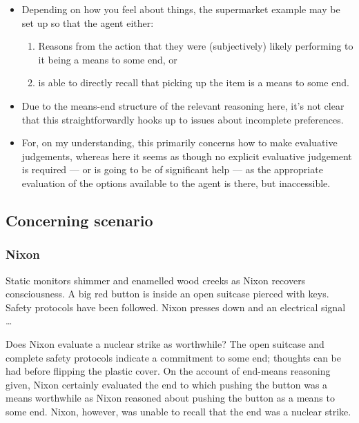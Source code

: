 \documentclass[10pt]{article}
\newcommand{\hozline}[0]{%
  \noindent\hdashrule[0.5ex][c]{\textwidth}{.1pt}{}
}
\begin{document}
\begin{itemize}
\item Depending on how you feel about things, the supermarket example may be set up so that the agent either:
  \begin{enumerate}[label=\alph*)]
  \item Reasons from the action that they were (subjectively) likely performing to it being a means to some end, or
  \item is able to directly recall that picking up the item is a means to some end.
  \end{enumerate}
\end{itemize}

\begin{itemize}
\item Due to the means-end structure of the relevant reasoning here, it's not clear that this straightforwardly hooks up to issues about incomplete preferences.
\item For, on my understanding, this primarily concerns how to make evaluative judgements, whereas here it seems as though no explicit evaluative judgement is required --- or is going to be of significant help --- as the appropriate evaluation of the options available to the agent is there, but inaccessible.
\end{itemize}


\newpage

\subsection*{Concerning scenario}
\label{sec:concerning-scenario}

\hozline

\subsubsection*{Nixon}

\begin{scenario}
  Static monitors shimmer and enamelled wood creeks as Nixon recovers consciousness.
  A big red button is inside an open suitcase pierced with keys.
  Safety protocols have been followed.
  Nixon presses down and an electrical signal \dots
\end{scenario}


Does Nixon evaluate a nuclear strike as worthwhile?
The open suitcase and complete safety protocols indicate a commitment to some end; thoughts can be had before flipping the plastic cover.
On the account of end-means reasoning given, Nixon certainly evaluated the end to which pushing the button was a means worthwhile as Nixon reasoned about pushing the button as a means to some end.
Nixon, however, was unable to recall that the end was a nuclear strike.
\end{document}
